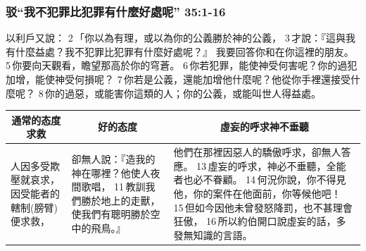 \subsubsection{驳“我不犯罪比犯罪有什麼好處呢” 35:1-16}
以利戶又說： 2 「你以為有理，或以為你的公義勝於神的公義， 3 才說：『這與我有什麼益處？我不犯罪比犯罪有什麼好處呢？』
我要回答你和在你這裡的朋友。 5 你要向天觀看，瞻望那高於你的穹蒼。 6 你若犯罪，能使神受何害呢？你的過犯加增，能使神受何損呢？ 7 你若是公義，還能加增他什麼呢？他從你手裡還接受什麼呢？ 8 你的過惡，或能害你這類的人；你的公義，或能叫世人得益處。
\begin{table}[H]
\centering
\begin{tabular}{p{2.4cm}|p{4.500cm}|p{10.00cm}}\hline\hline
\multicolumn{1}{c|}{通常的态度求救}&\multicolumn{1}{c|}{好的态度}&\multicolumn{1}{c}{虛妄的呼求神不垂聽}\\\hline
人因多受欺壓就哀求，因受能者的轄制(膀臂)便求救，
&卻無人說：『造我的神在哪裡？他使人夜間歌唱， 11 教訓我們勝於地上的走獸，使我們有聰明勝於空中的飛鳥。』
&他們在那裡因惡人的驕傲呼求，卻無人答應。 13 虛妄的呼求，神必不垂聽，全能者也必不眷顧。 14 何況你說，你不得見他，你的案件在他面前，你等候他吧！ 15 但如今因他未曾發怒降罰，也不甚理會狂傲， 16 所以約伯開口說虛妄的話，多發無知識的言語。\\\hline
\end{tabular}
\end{table} 


